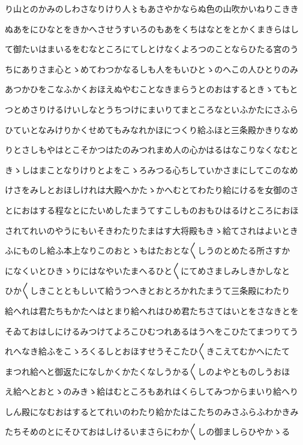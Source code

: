 \documentclass[a4paper,11pt,landscape]{ltjtarticle}
\begin{document}
り山とのかみのしわさなりけり人〻もあさやかならぬ色の山吹かいねりこきき
\par\medskip
ぬあをにひなとをきかへさせうすいろのもあをくちはなとをとかくまきらはし
\par\medskip
て御たいはまいるをむなところにてしとけなくよろつのことならひたる宮のう
\par\medskip
ちにありさま心とゝめてわつかなるしも人をもいひとゝのへこの人ひとりのみ
\par\medskip
あつかひをこなふかくおほえぬやむことなきまらうとのおはするときゝてもと
\par\medskip
つとめさりけるけいしなとうちつけにまいりてまところなといふかたにさふら
\par\medskip
ひていとなみけりかくせめてもみなれかほにつくり給ふほと三条殿かきりなめ
\par\medskip
りとさしもやはとこそかつはたのみつれまめ人の心かはるはなこりなくなむと
\par\medskip
きゝしはまことなりけりとよをこゝろみつる心ちしていかさまにしてこのなめ
\par\medskip
けさをみしとおほしけれは大殿へかたゝかへむとてわたり給にけるを女御のさ
\par\medskip
とにおはする程なとにたいめしたまうてすこしものおもひはるけところにおほ
\par\medskip
されてれいのやうにもいそきわたりたまはす大将殿もきゝ給てされはよいとき
\par\medskip
ふにものし給ふ本上なりこのおとゝもはたおとな〱しうのとめたる所さすか
\par\medskip
になくいとひきゝりにはなやいたまへるひと〱にてめさましみしきかしなと
\par\medskip
ひか〱しきことともしいて給うつへきとおとろかれたまうて三条殿にわたり
\par\medskip
給へれは君たちもかたへはとまり給へれはひめ君たちさてはいとをさなきとを
\par\medskip
そゐておはしにけるみつけてよろこひむつれあるはうへをこひたてまつりてう
\par\medskip
れへなき給ふをこゝろくるしとおほすせうそこたひ〱きこえてむかへにたて
\par\medskip
まつれ給へと御返たになしかくかたくなしうかる〱しのよやとものしうおほ
\par\medskip
え給へとおとゝのみきゝ給はむところもあれはくらしてみつからまいり給へり
\par\medskip
しん殿になむおはするとてれいのわたり給かたはこたちのみさふらふわかきみ
\par\medskip
たちそめのとにそひておはしけるいまさらにわか〱しの御ましらひやかゝる
\end{document}
